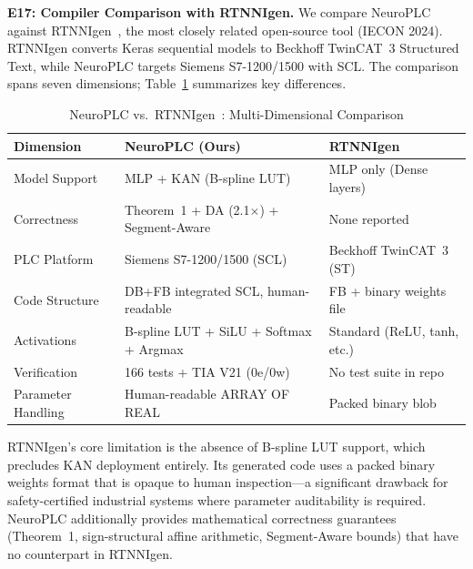 \documentclass[journal,onecolumn]{IEEEtran}
\begin{document}
\noindent\textbf{E17: Compiler Comparison with RTNNIgen.}
We compare NeuroPLC against RTNNIgen~\cite{rtnnigen2024}, the most
closely related open-source tool (IECON 2024). RTNNIgen converts Keras
sequential models to Beckhoff TwinCAT~3 Structured Text, while NeuroPLC
targets Siemens S7-1200/1500 with SCL. The comparison spans seven dimensions;
Table~\ref{tab:rtnnigen} summarizes key differences.

\begin{table}[t]
\centering
\caption{NeuroPLC vs.\ RTNNIgen~\cite{rtnnigen2024}: Multi-Dimensional Comparison}
\label{tab:rtnnigen}
\footnotesize
\begin{tabular}{@{}p{1.9cm}p{2.9cm}p{2.9cm}@{}}
\toprule
\textbf{Dimension} & \textbf{NeuroPLC (Ours)} & \textbf{RTNNIgen} \\
\midrule
Model Support & MLP + KAN (B-spline LUT) & MLP only (Dense layers) \\
\addlinespace
Correctness & Theorem~1 + DA (2.1$\times$) + Segment-Aware & None reported \\
\addlinespace
PLC Platform & Siemens S7-1200/1500 (SCL) & Beckhoff TwinCAT~3 (ST) \\
\addlinespace
Code Structure & DB+FB integrated SCL, human-readable & FB + binary weights file \\
\addlinespace
Activations & B-spline LUT + SiLU + Softmax + Argmax & Standard (ReLU, tanh, etc.) \\
\addlinespace
Verification & 166 tests + TIA V21 (0e/0w) & No test suite in repo \\
\addlinespace
Parameter Handling & Human-readable ARRAY OF REAL & Packed binary blob \\
\bottomrule
\end{tabular}
\end{table}

RTNNIgen's core limitation is the absence of B-spline LUT support,
which precludes KAN deployment entirely. Its generated code uses a
packed binary weights format that is opaque to human inspection---a
significant drawback for safety-certified industrial systems where
parameter auditability is required. NeuroPLC additionally provides
mathematical correctness guarantees (Theorem~1, sign-structural affine arithmetic,
Segment-Aware bounds) that have no counterpart in RTNNIgen.
\end{document}
